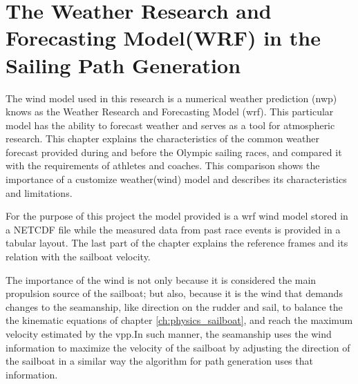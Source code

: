 
\chapter{The Weather Research and Forecasting Model(WRF) in the Sailing Path Generation} \label{ch:weatherModel} %

The wind model used in this research is a numerical weather prediction (\acrshort{nwp}) knows as the Weather Research and Forecasting Model (\acrshort{wrf}). This particular model has the ability to forecast weather and serves as a tool for atmospheric research.  
This chapter explains the characteristics of the common weather forecast provided during and before the Olympic sailing races, and compared it with the requirements of athletes and coaches. This comparison shows the importance of a customize weather(wind) model and describes its characteristics and limitations. \par \noindent 
For the purpose of this project the model provided is a \acrshort{wrf} wind model stored in a NETCDF file while the measured data from past race events is provided in a tabular layout. The last part of the chapter explains the reference frames and its relation with %
the sailboat velocity.\par

The importance of the wind is not only because it is considered the main propulsion source of the sailboat; but also, because it is the wind that demands changes to the seamanship, like direction on the rudder and sail, to balance the the kinematic equations of chapter \ref{ch:physics_sailboat}, and reach the maximum velocity  estimated by the \acrshort{vpp}.In such manner, the seamanship uses the wind information to maximize the velocity of the sailboat by adjusting the direction of the sailboat in a similar way the algorithm for path generation uses that information. \par 

